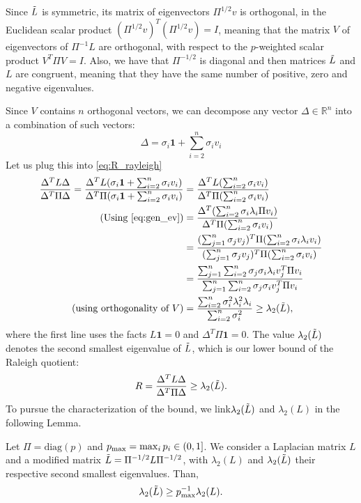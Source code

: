 \documentclass{article}
\begin{document}
Since $\Tilde{L}$ is symmetric, its matrix of eigenvectors $\Pi^{1/2}v$ is orthogonal, in the Euclidean scalar product $(\Pi^{1/2}v)^T(\Pi^{1/2}v)=I$, meaning that the matrix $V$ of eigenvectors of $\Pi^{-1}L$ are orthogonal, with respect to the $p$-weighted scalar product $V^T\Pi V=I$. Also, we have that $\Pi^{-1/2}$ is diagonal and then matrices $\Tilde{L}$ and $L$ are congruent, meaning that they have the same number of positive, zero and negative eigenvalues.

Since $V$ contains $n$ orthogonal vectors, we can decompose any vector $\Delta \in \mathbb{R}^n$ into a combination of such vectors:
\begin{equation*}
\Delta = \sigma_i \mathbf{1} + \sum_{i=2}^n \sigma_i v_i
\end{equation*}
Let us plug this into \ref{eq:R_rayleigh}
\begin{align*}
\frac{\Delta^TL\Delta}{\Delta^T \Pi \Delta} = \frac{\Delta^T L(\sigma_i \mathbf{1} + \sum_{i=2}^n \sigma_i v_i)}{\Delta^T \Pi(\sigma_i \mathbf{1} + \sum_{i=2}^n \sigma_i v_i)} &=
\frac{\Delta^T L(\sum_{i=2}^n \sigma_i v_i)}{\Delta^T \Pi(\sum_{i=2}^n \sigma_i v_i)} \\
\text{(Using \ref{eq:gen_ev})} &=\frac{\Delta^T(\sum_{i=2}^n \sigma_i \lambda_i \Pi v_i)}{\Delta^T \Pi(\sum_{i=2}^n \sigma_i v_i)} \\
&=\frac{(\sum_{j=1}^n \sigma_j v_j)^T \Pi (\sum_{i=2}^n \sigma_i \lambda_i v_i)}{(\sum_{j=1}^n \sigma_j v_j)^T \Pi (\sum_{i=2}^n \sigma_i v_i)} \\
&=\frac{\sum_{j=1}^n \sum_{i=2}^n \sigma_j \sigma_i \lambda_i v_j^T \Pi v_i}{\sum_{j=1}^n \sum_{i=2}^n \sigma_j \sigma_i v_j^T \Pi v_i} \\
\text{(using orthogonality of $V$)} &=
\frac{\sum_{i=2}^n \sigma_i^2 \lambda_i^2 \lambda_i}{\sum_{i=2}^n \sigma_i^2} \ge \lambda_2(\Tilde{L}),\\
\end{align*} 
where the first line uses the facts $L \mathbf{1} = 0$ and $\Delta^T\Pi \mathbf{1} = 0$. The value $\lambda_2(\Tilde{L})$ denotes the second smallest eigenvalue of $\Tilde{L}$, which is our lower bound of the Raleigh quotient:
\begin{equation*}
R = \frac{\Delta^T L \Delta}{\Delta^T \Pi \Delta} \ge \lambda_2(\Tilde{L}).
\end{equation*}
To pursue the characterization of the bound, we link$\lambda_2(\Tilde{L})$ and $\lambda_2 (L)$ in the following Lemma.
\begin{lemma} \label{lem:lambda_bound}
Let $\Pi = \text{diag}(p)$ and $p_{\rm max} = \max_i p_i \in (0, 1]$. We consider a Laplacian matrix $L$ and a modified matrix $\Tilde{L}=\Pi^{-1/2}L \Pi^{-1/2}$, with $\lambda_2(L)$ and $\lambda_2 (\Tilde{L})$ their respective second smallest eigenvalues. Than,
\begin{equation*}
\lambda_2 (\Tilde{L}) \ge p_{\rm max}^{-1} \lambda_2 (L).
\end{equation*}
\end{lemma}
\end{document}
